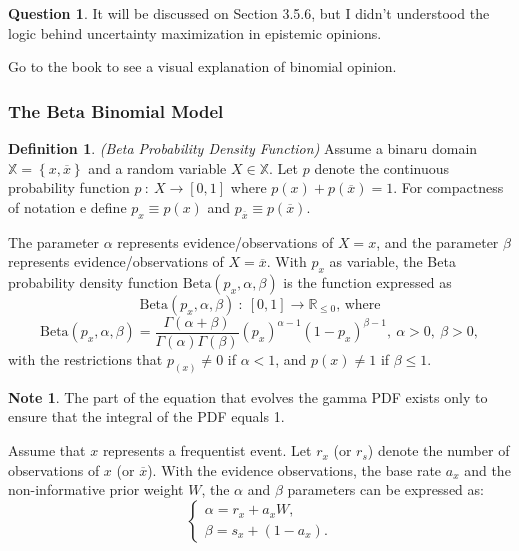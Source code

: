 \documentclass[a4paper,12pt]{article}
\theoremstyle{definition}
\newtheorem{question}{Question}[section]
\newtheorem{definition}{Definition}[section]
\newtheorem{note}{Note}[section]
\numberwithin{equation}{section}
\begin{document}
\begin{question}
	It will be discussed on Section 3.5.6, but I didn't understood the logic behind uncertainty maximization in epistemic opinions.
\end{question}

Go to the book to see a visual explanation of binomial opinion.

\subsubsection{The Beta Binomial Model}

\begin{definition}
	\emph{(Beta Probability Density Function)} Assume a binaru domain $\mathbb{X} = \left\{x,\overline{x}\right\}$ and a random variable $X \in \mathbb{X}$. Let $p$ denote the continuous probability function $p\ :\ X \rightarrow \left[0,1\right]$ where $p(x) + p(\overline{x}) = 1$. For compactness of notation e define $p_x \equiv p\left(x\right)$ and $p_{\overline{x}} \equiv p\left(\overline{x}\right)$.
	
	The parameter $\alpha$ represents evidence/observations of $X = x$, and the parameter $\beta$ represents evidence/observations of $X = \overline{x}$. With $p_x$ as variable, the Beta probability density function $\mathrm{Beta}(p_x, \alpha, \beta)$ is the function expressed as
	\begin{equation}
		\mathrm{Beta}(p_x, \alpha, \beta)\ :\ [0, 1] \rightarrow \mathbb{R}_{\leq0}\text{, where}
	\end{equation}
	\begin{equation}
		\mathrm{Beta}(p_x, \alpha, \beta) = \dfrac{\Gamma(\alpha + \beta)}{\Gamma(\alpha)\Gamma(\beta)}(p_x)^{\alpha - 1}(1 - p_x)^{\beta - 1},\ \alpha > 0,\ \beta > 0,
	\end{equation}
	with the restrictions that $p_(x) \neq 0$ if $\alpha < 1$, and $p(x) \neq 1$ if $\beta \leq 1$.
\end{definition}

\begin{note}
	The part of the equation that evolves the gamma PDF exists only to ensure that the integral of the PDF equals 1. 
\end{note}

Assume that $x$ represents a frequentist event. Let $r_x$ (or $r_s$) denote the number of observations of $x$ (or $\overline{x}$). With the evidence observations, the base rate $a_x$ and the non-informative prior weight $W$, the $\alpha$ and $\beta$ parameters can be expressed as:
\begin{equation}
	\begin{cases}
		\alpha = r_x + a_x W\text{,} \\
		\beta = s_x + (1 - a_x)\text{.}
	\end{cases}
\end{equation}
\end{document}
